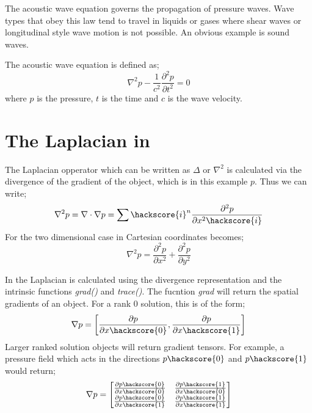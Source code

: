 
%
%
%



The acoustic wave equation governs the propagation of pressure waves. Wave
types that obey this law tend to travel in liquids or gases where shear waves
or longitudinal style wave motion is not possible. An obvious example is sound
waves.

The acoustic wave equation is defined as;
\begin{equation}
 \nabla ^2 p - \frac{1}{c^2} \frac{\partial ^2 p}{\partial t^2} = 0
\label{eqn:acswave}
\end{equation}
where $p$ is the pressure, $t$ is the time and $c$ is the wave velocity. 

\section{The Laplacian in \esc}
The Laplacian opperator which can be written as $\Delta$ or $\nabla^2$  is
calculated via the divergence of the gradient of the object, which is in this
example $p$. Thus we can write;
\begin{equation}
 \nabla^2 p = \nabla \cdot \nabla p = 
	\sum\hackscore{i}^n
	\frac{\partial^2 p}{\partial x^2\hackscore{i}}
 \label{eqn:laplacian}
\end{equation}
For the two dimensional case in Cartesian coordinates 
becomes;
\begin{equation}
 \nabla^2 p = \frac{\partial^2 p}{\partial x^2} 
		   + \frac{\partial^2 p}{\partial y^2}
\end{equation}

In \esc the Laplacian is calculated using the divergence representation and the
intrinsic functions \textit{grad()} and \textit{trace()}. The fucntion
\textit{grad{}} will return the spatial gradients of an object.  
For a rank 0 solution, this is of the form;
\begin{equation}
 \nabla p = \left[
	   \frac{\partial p}{\partial x \hackscore{0}},  
	   \frac{\partial p}{\partial x \hackscore{1}}
                  \right]
\label{eqn:grad}
\end{equation}
Larger ranked solution objects will return gradient tensors. For example, a
pressure field which acts in the directions $p \hackscore{0}$ and $p
\hackscore{1}$ would return;
\begin{equation}
  \nabla p = \begin{bmatrix}
	   \frac{\partial p \hackscore{0}}{\partial x \hackscore{0}} &
		\frac{\partial p \hackscore{1}}{\partial x \hackscore{0}} \\
	  \frac{\partial p \hackscore{0}}{\partial x \hackscore{1}} &
		\frac{\partial p \hackscore{1}}{\partial x \hackscore{1}} 
                  \end{bmatrix}
\label{eqn:gradrank1}
\end{equation}

